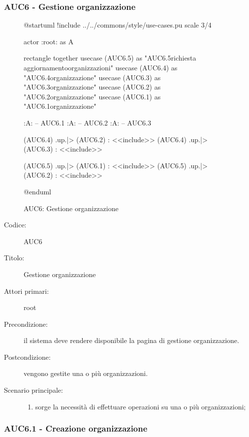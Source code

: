 \documentclass[casi-duso]{subfiles}
\begin{document}
\subsubsection{AUC6 - Gestione organizzazione}%
\label{subsub:AUC6}

\begin{figure}[h!] 
  \centering 
  \begin{plantuml}
  @startuml 
  !include ../../commons/style/use-cases.pu
  scale 3/4

  actor :root: as A

  rectangle {
    together {
      usecase (AUC6.5) as "AUC6.5\nInvio richiesta aggiornamento\nlista organizzazioni"
      usecase (AUC6.4) as "AUC6.4\nSeleziona organizzazione"
      usecase (AUC6.3) as "AUC6.3\nModifica organizzazione"
      usecase (AUC6.2) as "AUC6.2\nEliminazione organizzazione"
      usecase (AUC6.1) as "AUC6.1\nCreazione organizzazione"
    }
  }

  :A: -- AUC6.1
  :A: -- AUC6.2
  :A: -- AUC6.3

  (AUC6.4) .up.|> (AUC6.2) : <<include>>
  (AUC6.4) .up.|> (AUC6.3) : <<include>>

  (AUC6.5) .up.|> (AUC6.1) : <<include>>
  (AUC6.5) .up.|> (AUC6.2) : <<include>>

  @enduml
  \end{plantuml} 
  \caption{AUC6: Gestione organizzazione} 
  \label{fig:auc6} 
\end{figure}

\begin{description}
  \item[Codice:] AUC6
  \item[Titolo:] Gestione organizzazione
  \item[Attori primari:] root
  \item[Precondizione:] il sistema deve rendere disponibile la pagina di gestione organizzazione.
  \item[Postcondizione:] vengono gestite una o più organizzazioni.
  \item[Scenario principale:]
  \begin{enumerate}
    \item sorge la necessità di effettuare operazioni su una o più organizzazioni;
  \end{enumerate}
\end{description}

  \subsubsection{AUC6.1 - Creazione organizzazione}%
  \label{subsub:AUC6.1}
\end{document}
